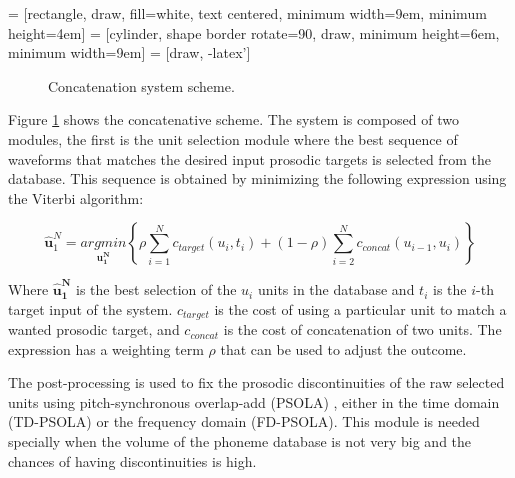  = [rectangle, draw, fill=white, text centered, minimum width=9em, minimum height=4em]
 = [cylinder, shape border rotate=90, draw, minimum height=6em, minimum width=9em]
 = [draw, -latex']

\begin{figure}[h]
    \centering
    \caption{Concatenation system scheme.}
    \label{fig:concat-sys}
\end{figure}

Figure \ref{fig:concat-sys} shows the concatenative scheme. The system is composed of two modules, the first is the unit selection module where the best sequence of waveforms that matches the desired input prosodic targets is selected from the database. This sequence is obtained by minimizing the following expression using the Viterbi algorithm:

\begin{equation}
    \mathbf{\hat{u}}_1^N = \underset{\mathbf{u_1^N}}{argmin} \left \{ \rho \sum_{i=1}^{N} c_{target} (u_i, t_i) + (1-\rho) \sum_{i=2}^{N} c_{concat} (u_{i-1}, u_i) \right \}
\end{equation}

Where $\mathbf{\hat{u}_1^N}$ is the best selection of the $u_i$ units in the database and $t_i$ is the $i$-th target input of the system. $c_{target}$ is the cost of using a particular unit to match a wanted prosodic target, and $c_{concat}$ is the cost of concatenation of two units. The expression has a weighting term $\rho$ that can be used to adjust the outcome.

The post-processing is used to fix the prosodic discontinuities of the raw selected units using pitch-synchronous overlap-add (PSOLA) \cite{moulines1990pitch}, either in the time domain (TD-PSOLA) or the frequency domain (FD-PSOLA). This module is needed specially when the volume of the phoneme database is not very big and the chances of having discontinuities is high.

